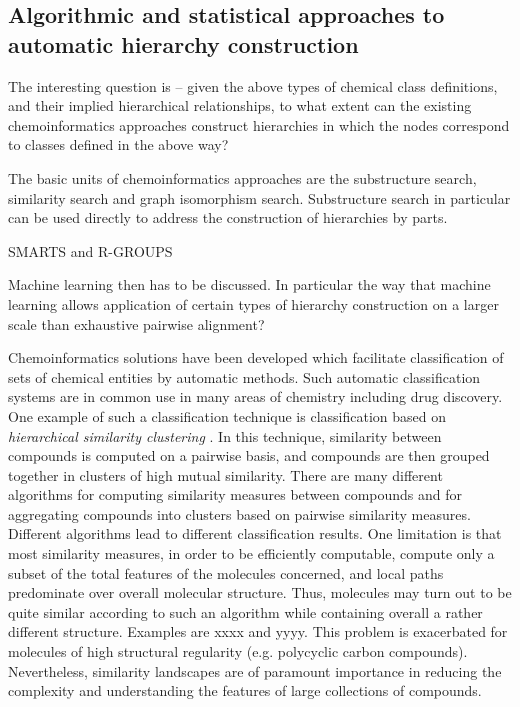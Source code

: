 \documentclass[10pt]{bmc_article}
\newenvironment{bmcformat}{\baselineskip20pt\sloppy\setboolean{publ}{false}}{\baselineskip20pt\sloppy}
\begin{document}
\begin{bmcformat}
\subsection*{Algorithmic and statistical approaches to automatic hierarchy construction}
\label{sec:resultscheminf}


The interesting question is -- given the above types of chemical class definitions, and their implied hierarchical relationships, to what extent can the existing chemoinformatics approaches construct hierarchies in which the nodes correspond to classes defined in the above way? 

The basic units of chemoinformatics approaches are the substructure search, similarity search and graph isomorphism search.  Substructure search in particular can be used directly to address the construction of hierarchies by parts. 

SMARTS and R-GROUPS

Machine learning then has to be discussed.  In particular the way that machine learning allows application of certain types of hierarchy construction on a larger scale than exhaustive pairwise alignment?  

Chemoinformatics solutions have been developed which facilitate classification of sets of chemical entities by automatic methods.  Such automatic classification systems are in common use in many areas of chemistry including drug discovery. One example of such a classification technique is classification based on \textit{hierarchical similarity clustering} \cite{barnard1992}.  In this technique, similarity between compounds is computed on a pairwise basis, and compounds are then grouped together in clusters of high mutual similarity. There are many different algorithms for computing similarity measures between compounds and for aggregating compounds into clusters based on pairwise similarity measures. Different algorithms lead to different classification results. 
One limitation is that most similarity measures, in order to be efficiently computable, compute only a subset of the total features of the molecules concerned, and local paths predominate over overall molecular structure. Thus, molecules may turn out to be quite similar according to such an algorithm while containing overall a rather different structure. Examples are xxxx and yyyy.  This problem is exacerbated for molecules of high structural regularity (e.g. polycyclic carbon compounds).  Nevertheless, similarity landscapes are of paramount importance in reducing the complexity and understanding the features of large collections of compounds. %


\end{bmcformat}
\end{document}
